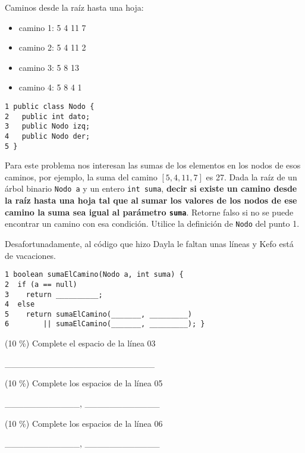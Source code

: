\documentclass[twocolumn]{article}
\begin{document}
Caminos desde la raíz hasta una hoja:\\
\begin{itemize}
 \item  camino 1: 5 4 11 7
   \item camino 2: 5 4 11 2
   \item camino 3: 5 8 13
   \item camino 4: 5 8 4 1\\
 \end{itemize}

\small
\begin{verbatim}
1 public class Nodo {
2   public int dato;
3   public Nodo izq;
4   public Nodo der;
5 }
\end{verbatim}

Para este problema nos interesan las sumas de los elementos en los nodos de esos caminos, por ejemplo, la suma del camino $[5,4,11,7]$ es 27.
Dada la raíz de un árbol binario \texttt{Nodo a} y un entero \texttt{int suma}, \textbf{decir si existe un camino desde la raíz hasta una hoja tal
que al sumar los valores de los nodos de ese camino la suma sea igual al parámetro \texttt{suma}}. Retorne falso si no se puede encontrar
un camino con esa condición. Utilice la definición de \texttt{Nodo} del punto 1.

Desafortunadamente, al código que hizo Dayla le faltan unas líneas y Kefo está de vacaciones.

{\small
\begin{verbatim}
1 boolean sumaElCamino(Nodo a, int suma) {
2  if (a == null)
3    return __________;
4  else
5    return sumaElCamino(_______, _________) 
6        || sumaElCamino(_______, _________); }
\end{verbatim}
}





	 (10 \%) Complete el espacio de la línea 03

	\_\_\_\_\_\_\_\_\_\_\_\_\_\_\_\_\_\_\_\_\_\_\_\_

	 (10 \%) Complete los espacios de la línea 05

	\_\_\_\_\_\_\_\_\_\_\_\_, \_\_\_\_\_\_\_\_\_\_\_\_

	 (10 \%) Complete los espacios de la línea 06	

	\_\_\_\_\_\_\_\_\_\_\_\_, \_\_\_\_\_\_\_\_\_\_\_\_


\end{document}
